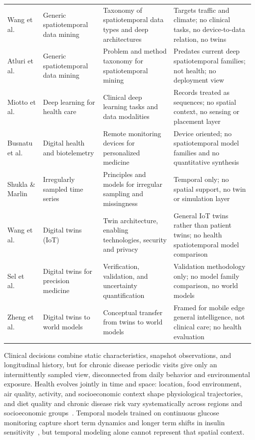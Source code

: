 \documentclass[journal]{IEEEtran}
\newif\ifsubmission
\begin{document}
\begin{table}[t]
\begin{tabularx}{\textwidth}{>{\raggedright\arraybackslash}p{2.5cm} >{\raggedright\arraybackslash}p{2.6cm} >{\raggedright\arraybackslash}X >{\raggedright\arraybackslash}X}
\midrule
Wang et al.~\cite{wang2022deep} & Generic spatiotemporal data mining & Taxonomy of spatiotemporal data types and deep architectures & Targets traffic and climate; no clinical tasks, no device-to-data relation, no twins \\
\addlinespace[2pt]
Atluri et al.~\cite{atluri2018stdm} & Generic spatiotemporal data mining & Problem and method taxonomy for spatiotemporal mining & Predates current deep spatiotemporal families; not health; no deployment view \\
\addlinespace[2pt]
Miotto et al.~\cite{miotto2018deeplearning} & Deep learning for health care & Clinical deep learning tasks and data modalities & Records treated as sequences; no spatial context, no sensing or placement layer \\
\addlinespace[2pt]
Busnatu et al.~\cite{Busnatu2022} & Digital health and biotelemetry & Remote monitoring devices for personalized medicine & Device oriented; no spatiotemporal model families and no quantitative synthesis \\
\addlinespace[2pt]
Shukla \& Marlin~\cite{shukla2021irregular} & Irregularly sampled time series & Principles and models for irregular sampling and missingness & Temporal only; no spatial support, no twin or simulation layer \\
\addlinespace[2pt]
Wang et al.~\cite{Wang2023Survey} & Digital twins (IoT) & Twin architecture, enabling technologies, security and privacy & General IoT twins rather than patient twins; no health spatiotemporal model comparison \\
\addlinespace[2pt]
Sel et al.~\cite{Sel2025VVUQ} & Digital twins for precision medicine & Verification, validation, and uncertainty quantification & Validation methodology only; no model family comparison, no world models \\
\addlinespace[2pt]
Zheng et al.~\cite{Zheng2026DTtoWM} & Digital twins to world models & Conceptual transfer from twins to world models & Framed for mobile edge general intelligence, not clinical care; no health evaluation \\
\bottomrule
\end{tabularx}
\fi
\end{table}

\ifsubmission
Clinical decisions combine static characteristics, snapshot observations, and longitudinal history, but for chronic disease periodic visits give only an intermittently sampled view, disconnected from daily behavior and environmental exposure. Health evolves jointly in time and space: location, food environment, air quality, activity, and socioeconomic context shape physiological trajectories, and diet quality and chronic disease risk vary systematically across regions and socioeconomic groups~\cite{McCullough2022Diet}. Temporal models trained on continuous glucose monitoring capture short term dynamics and longer term shifts in insulin sensitivity~\cite{Vaughan2025CGMPrediction}, but temporal modeling alone cannot represent that spatial context.
\end{document}

